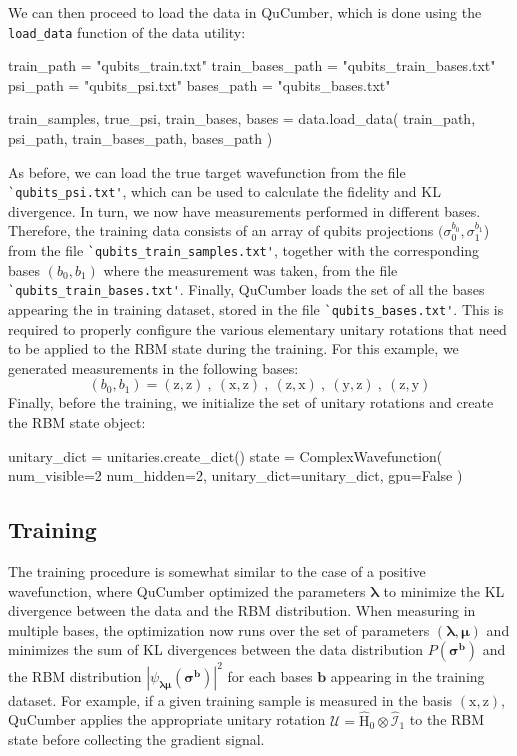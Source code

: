 \documentclass[submission, Phys]{SciPost}
\begin{document}
We can then proceed to load the data in QuCumber, which is done using the \verb|load_data| function of the data utility:
\begin{python}
train_path       = "qubits_train.txt"
train_bases_path = "qubits_train_bases.txt"
psi_path         = "qubits_psi.txt"
bases_path       = "qubits_bases.txt"

train_samples, true_psi, train_bases, bases = data.load_data(
    train_path, psi_path, train_bases_path, bases_path
)
\end{python}
As before, we can load the true target wavefunction from the file \verb|`qubits_psi.txt'|, which can be used to calculate the fidelity and KL divergence. In turn, we now have measurements performed in different bases. Therefore, the training data consists of an array of qubits projections $(\sigma_0^{b_0},\sigma_1^{b_1}$) from the file \verb|`qubits_train_samples.txt'|, together with the corresponding bases $(b_0,b_1)$ where the measurement was taken, from the file \verb|`qubits_train_bases.txt'|. Finally, QuCumber loads the set of all the bases appearing the in training dataset, stored in the file \verb|`qubits_bases.txt'|. This is required to properly configure the various elementary unitary rotations that need to be applied to the RBM state during the training. For this example, we generated measurements in the following bases:
\begin{equation}
(b_0,b_1)=(\mathrm{z},\mathrm{z})\:,\:(\mathrm{x},\mathrm{z})\:,\:(\mathrm{z},\mathrm{x})\:,\:(\mathrm{y},\mathrm{z})\:,\:(\mathrm{z},\mathrm{y})
\end{equation}
Finally, before the training, we initialize the set of unitary rotations and create the RBM state object:
\begin{python}
unitary_dict = unitaries.create_dict()
state = ComplexWavefunction(
    num_visible=2 num_hidden=2, unitary_dict=unitary_dict, gpu=False
)

\end{python}




\subsection{Training}
The training procedure is somewhat similar to the case of a positive wavefunction, where QuCumber optimized the parameters $\bm{\lambda}$ to minimize the KL divergence between the data and the RBM distribution. When measuring in multiple bases, the optimization now runs over the set of parameters $(\bm{\lambda},\bm{\mu})$ and minimizes the sum of KL divergences between the data distribution $P(\bm{\sigma}^{\bm{b}})$ and the RBM distribution $|\psi_{\bm{\lambda\mu}}(\bm{\sigma}^{\bm{b}})|^2$ for each bases $\bm{b}$ appearing in the training dataset. For example, if a given training sample is measured in the basis $(\mathrm{x},\mathrm{z})$, QuCumber applies the appropriate unitary rotation $\bm{\mathcal{U}}=\hat{\mathrm{H}}_0\otimes\hat{\mathcal{I}}_1$ to the RBM state before collecting the gradient signal. 
\end{document}
